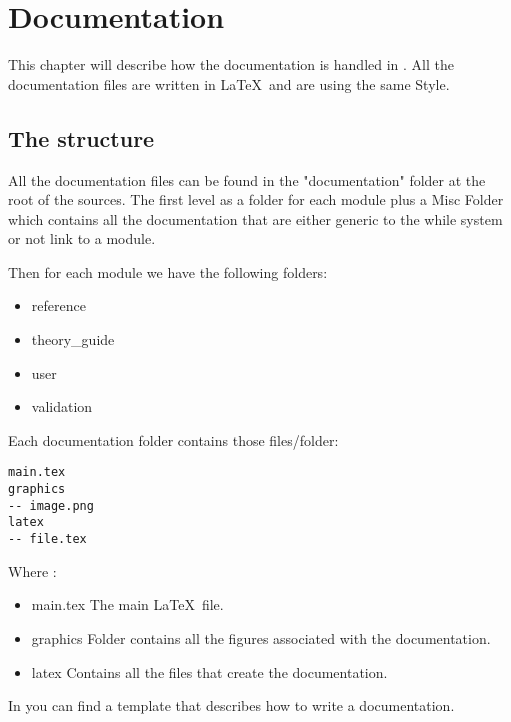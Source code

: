\chapter{Documentation}

This chapter will describe how the documentation is handled in \telemacsystem.
All the documentation files are written in \LaTeX\ and are using the same Style.

\section{The structure}
All the documentation files can be found in the "documentation" folder at the
root of the \telemacsystem sources. The first level as a folder for each module
plus a Misc Folder which contains all the documentation that are either generic
to the while system or not link to a module.

Then for each module we have the following folders:
\begin{itemize}
\item reference
\item theory\_guide
\item user
\item validation
\end{itemize}

Each documentation folder contains those files/folder:
\begin{verbatim}
main.tex
graphics
-- image.png
latex
-- file.tex
\end{verbatim}

Where :
\begin{itemize}
\item main.tex The main \LaTeX\ file.
\item graphics Folder contains all the figures associated with the
  documentation.
\item latex Contains all the files that create the documentation.
\end{itemize}

In  you can find a template that describes how
to write a \telemacsystem documentation.


